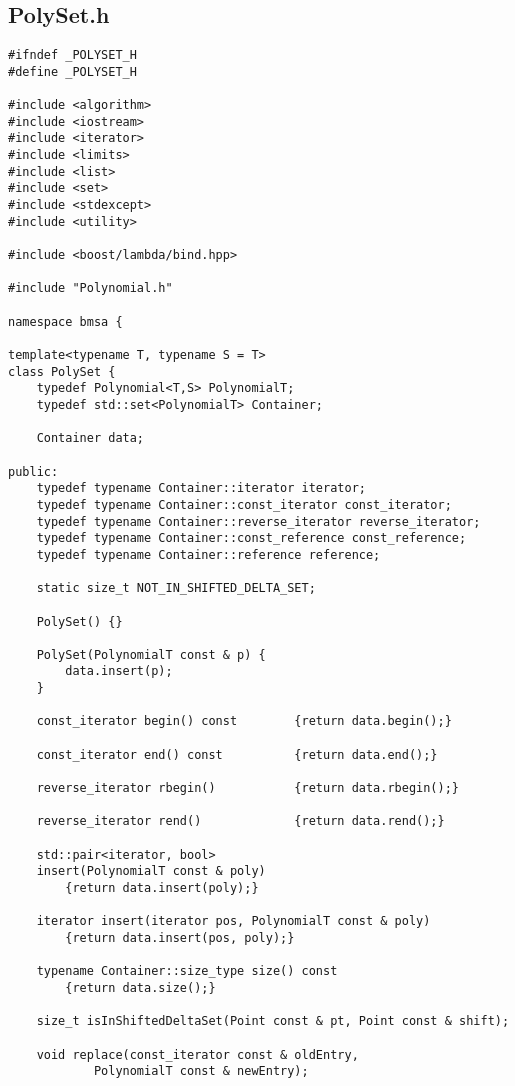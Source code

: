 \subsection*{PolySet.h}
\begin{lstlisting}
#ifndef _POLYSET_H
#define	_POLYSET_H

#include <algorithm>
#include <iostream>
#include <iterator>
#include <limits>
#include <list>
#include <set>
#include <stdexcept>
#include <utility>

#include <boost/lambda/bind.hpp>

#include "Polynomial.h"

namespace bmsa {

template<typename T, typename S = T>
class PolySet {
    typedef Polynomial<T,S> PolynomialT;
    typedef std::set<PolynomialT> Container;

    Container data;

public:
    typedef typename Container::iterator iterator;
    typedef typename Container::const_iterator const_iterator;
    typedef typename Container::reverse_iterator reverse_iterator;
    typedef typename Container::const_reference const_reference;
    typedef typename Container::reference reference;

    static size_t NOT_IN_SHIFTED_DELTA_SET;

    PolySet() {}

    PolySet(PolynomialT const & p) {
        data.insert(p);
    }

    const_iterator begin() const        {return data.begin();}

    const_iterator end() const          {return data.end();}

    reverse_iterator rbegin()           {return data.rbegin();}

    reverse_iterator rend()             {return data.rend();}

    std::pair<iterator, bool>
    insert(PolynomialT const & poly)
        {return data.insert(poly);}

    iterator insert(iterator pos, PolynomialT const & poly)
        {return data.insert(pos, poly);}

    typename Container::size_type size() const   
        {return data.size();}

    size_t isInShiftedDeltaSet(Point const & pt, Point const & shift);

    void replace(const_iterator const & oldEntry,
            PolynomialT const & newEntry);


\end{lstlisting}
